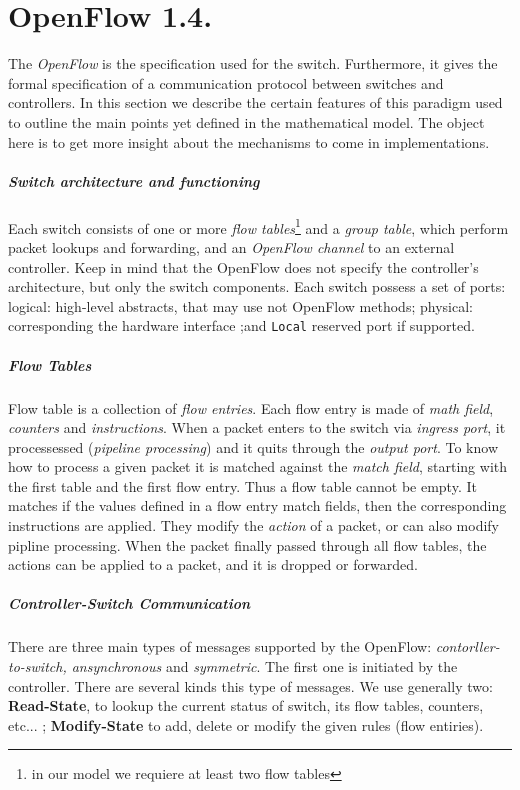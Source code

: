 \documentclass{article}
\begin{document}
\section{OpenFlow 1.4.}
The \emph{OpenFlow} is the specification used for the switch. Furthermore, it gives the formal specification of a communication protocol between switches and controllers. In this section we describe the certain features of this paradigm used to outline the main points yet defined in the mathematical model. The object here is to get more insight about the mechanisms to come in implementations.
\subparagraph{Switch architecture and functioning} Each switch consists of one or more \emph{flow tables}\footnote{in our model we requiere at least two flow tables} and a \emph{group table}, which perform packet lookups and forwarding, and an \emph{OpenFlow channel} to an external controller\cite{OpenFlow}. Keep in mind that the OpenFlow does not specify the controller's architecture, but only the switch components. 
Each switch possess a set of ports: logical: high-level abstracts, that may use not OpenFlow methods; physical: corresponding the hardware interface ;and \texttt{Local} reserved port if supported. 
\subparagraph{Flow Tables} Flow table is a collection of \emph{flow entries}. Each flow entry is made of \emph{math field}, \emph{counters} and \emph{instructions}. When a packet enters to the switch via \emph{ingress port}, it processessed (\emph{pipeline processing}) and it quits through the \emph{output port}.
To know how to process a given packet it is matched against the \emph{match field}, starting with the first table and the first flow entry. Thus a flow table cannot be empty. It matches if the values defined in a flow entry match fields, then the corresponding instructions are applied.  They modify the \emph{action} of a packet, or can also modify pipline processing. When the packet finally passed through all flow tables, the actions can be applied to a packet, and it is dropped or forwarded. 
\subparagraph{Controller-Switch Communication} There are three main types of messages supported by the OpenFlow: \emph{contorller-to-switch, ansynchronous} and \emph{symmetric}.
The first one is initiated by the controller. There are several kinds this type of messages. We use generally two: \textbf{Read-State}, to lookup the current status of switch, its flow tables, counters, etc... ; \textbf{Modify-State} to add, delete or modify the given rules (flow entiries).
\end{document}
